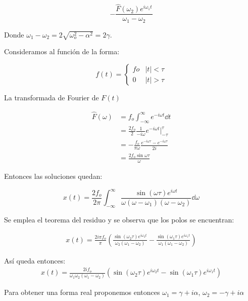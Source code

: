 \documentclass[11pt]{report}
\theoremstyle{plain}
\theoremstyle{definition}
\begin{document}
\begin{equation*}
	-\frac{\hat F (\omega_2) e^{i\omega_1 t}}{\omega_1-\omega_2}
\end{equation*}

Donde $\omega_1 - \omega_2 = 2\sqrt{\omega^2_o -\alpha^2} = 2\gamma$.

Consideramos al función de la forma:

\begin{equation*}
	f(t)=
	\begin{cases}
		fo & |t|<\tau\\
		0 & |t|>\tau
	\end{cases}
\end{equation*}

La transformada de Fourier de $F(t)$

\begin{align*}
	\hat F(\omega) &= f_o \int^\infty_{-\infty} e^{-i\omega t} \dd{t}\\
	&= \frac{2f_o}{2}\frac{1}{-i\omega}e^{-i\omega t}|^\tau_{-\tau}\\
	&= -\frac{f_o}{\pi\omega}\frac{e^{-i\omega \tau}- e^{-i\omega \tau}}{2i}\\
	&= \frac{2f_o\sin\omega\tau}{\omega}
\end{align*}

Entonces las soluciones quedan:

\begin{equation*}
	x(t)=\frac{2f_o}{2\pi}\int^\infty_{-\infty} \frac{\sin(\omega\tau) e^{i\omega t}}{\omega(\omega-\omega_1)(\omega	-\omega_2)}\dd{\omega}
\end{equation*}

Se emplea el teorema del residuo y se observa que los polos se encuentran:

\begin{align*}
	x(t)=\frac{2i\pi f_o}{\pi}(\frac{\sin(\omega_2\tau) e^{i\omega_2 t}}{\omega_2(\omega_1-\omega_2)}-\frac{\sin(\omega_1\tau) e^{i\omega_1 t}}{\omega_1(\omega_1-\omega_2)})
\end{align*}

Así queda entonces:
\begin{align*}
	x(t)=\frac{2if_o}{\omega_1\omega_2(\omega_1-\omega_2)}(
	\sin(\omega_2\tau) e^{i\omega_2 t} - \sin(\omega_1\tau) e^{i\omega_1 t})
\end{align*}

Para obtener una forma real proponemos entonces $\omega_1 = \gamma + i\alpha$, $\omega_2 = -\gamma + i\alpha$\\
\end{document}
